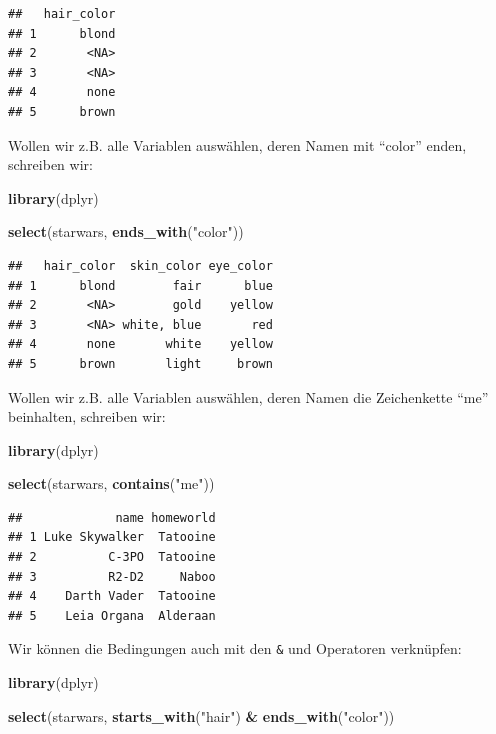 \documentclass[
]{book}
\newenvironment{Shaded}{\begin{snugshade}}{\end{snugshade}}
\newcommand{\FunctionTok}[1]{\textcolor[rgb]{0.13,0.29,0.53}{\textbf{#1}}}
\newcommand{\NormalTok}[1]{#1}
\newcommand{\SpecialCharTok}[1]{\textcolor[rgb]{0.81,0.36,0.00}{\textbf{#1}}}
\newcommand{\StringTok}[1]{\textcolor[rgb]{0.31,0.60,0.02}{#1}}
\newcounter{none} %
\begin{document}
\begin{verbatim}
##   hair_color
## 1      blond
## 2       <NA>
## 3       <NA>
## 4       none
## 5      brown
\end{verbatim}

Wollen wir z.B. alle Variablen auswählen, deren Namen mit ``color'' enden, schreiben wir:

\begin{Shaded}
\begin{Highlighting}[]
\FunctionTok{library}\NormalTok{(dplyr)}

\FunctionTok{select}\NormalTok{(starwars, }\FunctionTok{ends\_with}\NormalTok{(}\StringTok{"color"}\NormalTok{))}
\end{Highlighting}
\end{Shaded}

\begin{verbatim}
##   hair_color  skin_color eye_color
## 1      blond        fair      blue
## 2       <NA>        gold    yellow
## 3       <NA> white, blue       red
## 4       none       white    yellow
## 5      brown       light     brown
\end{verbatim}

Wollen wir z.B. alle Variablen auswählen, deren Namen die Zeichenkette ``me'' beinhalten, schreiben wir:

\begin{Shaded}
\begin{Highlighting}[]
\FunctionTok{library}\NormalTok{(dplyr)}

\FunctionTok{select}\NormalTok{(starwars, }\FunctionTok{contains}\NormalTok{(}\StringTok{"me"}\NormalTok{))}
\end{Highlighting}
\end{Shaded}

\begin{verbatim}
##             name homeworld
## 1 Luke Skywalker  Tatooine
## 2          C-3PO  Tatooine
## 3          R2-D2     Naboo
## 4    Darth Vader  Tatooine
## 5    Leia Organa  Alderaan
\end{verbatim}

Wir können die Bedingungen auch mit den \texttt{\&} und \texttt{\textbar{}} Operatoren verknüpfen:

\begin{Shaded}
\begin{Highlighting}[]
\FunctionTok{library}\NormalTok{(dplyr)}

\FunctionTok{select}\NormalTok{(starwars, }\FunctionTok{starts\_with}\NormalTok{(}\StringTok{"hair"}\NormalTok{) }\SpecialCharTok{\&} \FunctionTok{ends\_with}\NormalTok{(}\StringTok{"color"}\NormalTok{))}
\end{Highlighting}
\end{Shaded}
\end{document}
